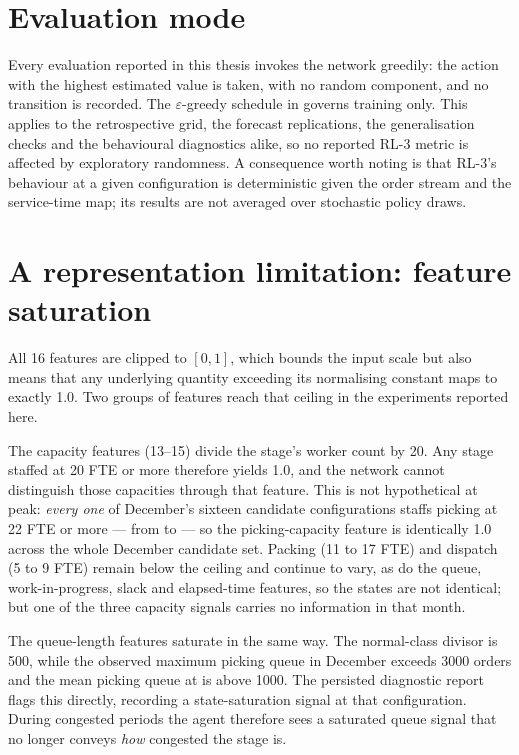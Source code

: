 \section{Evaluation mode}
\label{sec:app-greedy}

Every evaluation reported in this thesis invokes the network greedily: the action with the
highest estimated value is taken, with no random component, and no transition is recorded. The
\(\varepsilon\)-greedy schedule in  governs training only. This applies to the
retrospective grid, the forecast replications, the generalisation checks and the behavioural
diagnostics alike, so no reported RL-3 metric is affected by exploratory randomness. A
consequence worth noting is that RL-3's behaviour at a given configuration is deterministic given
the order stream and the service-time map; its results are not averaged over stochastic policy
draws.

\section{A representation limitation: feature saturation}
\label{sec:app-saturation}

All 16 features are clipped to \([0,1]\), which bounds the input scale but also means that any
underlying quantity exceeding its normalising constant maps to exactly \num{1.0}. Two groups of
features reach that ceiling in the experiments reported here.

The capacity features (13--15) divide the stage's worker count by \num{20}. Any stage staffed at
20 FTE or more therefore yields \num{1.0}, and the network cannot distinguish those capacities
through that feature. This is not hypothetical at peak: \emph{every one} of December's sixteen
candidate configurations staffs picking at 22 FTE or more --- from  to
 --- so the picking-capacity feature is identically \num{1.0} across the whole
December candidate set. Packing (11 to 17 FTE) and dispatch (5 to 9 FTE) remain below the
ceiling and continue to vary, as do the queue, work-in-progress, slack and elapsed-time features,
so the states are not identical; but one of the three capacity signals carries no information in
that month.

The queue-length features saturate in the same way. The normal-class divisor is \num{500}, while
the observed maximum picking queue in December exceeds \num{3000} orders and the mean picking
queue at  is above \num{1000}. The persisted diagnostic report flags this
directly, recording a state-saturation signal at that configuration. During congested periods the
agent therefore sees a saturated queue signal that no longer conveys \emph{how} congested the
stage is.

